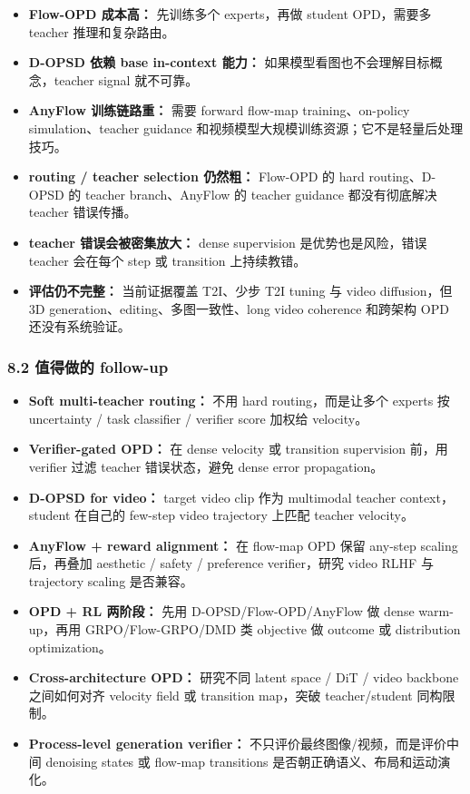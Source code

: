 \begin{itemize}[leftmargin=1.5em]
  \item \textbf{Flow-OPD 成本高：} 先训练多个 experts，再做 student OPD，需要多 teacher 推理和复杂路由。
  \item \textbf{D-OPSD 依赖 base in-context 能力：} 如果模型看图也不会理解目标概念，teacher signal 就不可靠。
  \item \textbf{AnyFlow 训练链路重：} 需要 forward flow-map training、on-policy simulation、teacher guidance 和视频模型大规模训练资源；它不是轻量后处理技巧。
  \item \textbf{routing / teacher selection 仍然粗：} Flow-OPD 的 hard routing、D-OPSD 的 teacher branch、AnyFlow 的 teacher guidance 都没有彻底解决 teacher 错误传播。
  \item \textbf{teacher 错误会被密集放大：} dense supervision 是优势也是风险，错误 teacher 会在每个 step 或 transition 上持续教错。
  \item \textbf{评估仍不完整：} 当前证据覆盖 T2I、少步 T2I tuning 与 video diffusion，但 3D generation、editing、多图一致性、long video coherence 和跨架构 OPD 还没有系统验证。
\end{itemize}

\subsubsection{8.2 值得做的 follow-up}

\begin{itemize}[leftmargin=1.5em]
  \item \textbf{Soft multi-teacher routing：} 不用 hard routing，而是让多个 experts 按 uncertainty / task classifier / verifier score 加权给 velocity。
  \item \textbf{Verifier-gated OPD：} 在 dense velocity 或 transition supervision 前，用 verifier 过滤 teacher 错误状态，避免 dense error propagation。
  \item \textbf{D-OPSD for video：} target video clip 作为 multimodal teacher context，student 在自己的 few-step video trajectory 上匹配 teacher velocity。
  \item \textbf{AnyFlow + reward alignment：} 在 flow-map OPD 保留 any-step scaling 后，再叠加 aesthetic / safety / preference verifier，研究 video RLHF 与 trajectory scaling 是否兼容。
  \item \textbf{OPD + RL 两阶段：} 先用 D-OPSD/Flow-OPD/AnyFlow 做 dense warm-up，再用 GRPO/Flow-GRPO/DMD 类 objective 做 outcome 或 distribution optimization。
  \item \textbf{Cross-architecture OPD：} 研究不同 latent space / DiT / video backbone 之间如何对齐 velocity field 或 transition map，突破 teacher/student 同构限制。
  \item \textbf{Process-level generation verifier：} 不只评价最终图像/视频，而是评价中间 denoising states 或 flow-map transitions 是否朝正确语义、布局和运动演化。
\end{itemize}

